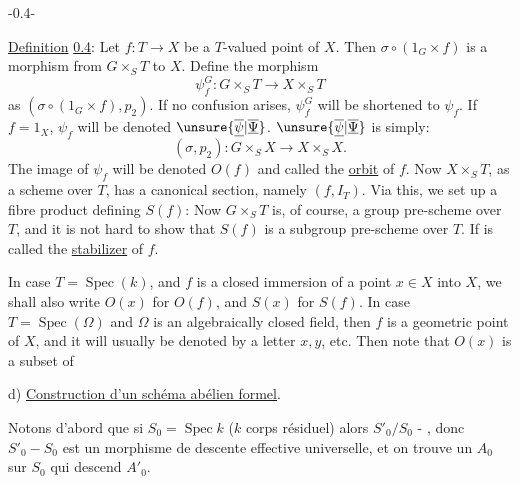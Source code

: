 \begin{center}-0.4-\end{center}
\uline{Definition} \uline{0.4}: Let $f:T\longrightarrow X$ be a $T$-valued point of $X$. Then $\sigma\circ(1_G\times f)$ is a morphism from $G\times_S T$ to $X$. Define the morphism
\[
\psi_f^G:G\times_S T\longrightarrow X\times_S T
\]
as $(\sigma\circ(1_G\times f),p_2)$. If no confusion arises, $\psi_f^G$ will be shortened to $\psi_f$. If $f=1_X$, $\psi_f$ will be denoted $\unsure{\overline{\underline{\psi}}|\overline{\underline{\Psi}}}$. $\unsure{\overline{\underline{\psi}}|\overline{\underline{\Psi}}}$ is simply:
\[
(\sigma,p_2):G\times_S X\longrightarrow X\times_S X.
\]
The image of $\psi_f$ will be denoted $O(f)$ and called the \uline{orbit} of $f$. Now $X\times_S T$, as a scheme over $T$, has a canonical section, namely $(f,I_T)$. Via this, we set up a fibre product defining $S(f)$:
Now $G\times_S T$ is, of course, a group pre-scheme over $T$, and it is not hard to show that $S(f)$ is a subgroup pre-scheme over $T$. If is called the \uline{stabilizer} of $f$.

In case $T=\operatorname{Spec}(k)$, and $f$ is a closed immersion of a point $x\in X$ into $X$, we shall also write $O(x)$ for $O(f)$, and $S(x)$ for $S(f)$. In case $T=\operatorname{Spec}(\Omega)$ and $\Omega$ is an algebraically closed field, then $f$ is a geometric point of $X$, and it will usually be denoted by a letter $x,y$, etc. Then note that $O(x)$ is a subset of

d) \uline{Construction d'un schéma abélien formel}.

Notons d'abord que si $S_0=\operatorname{Spec}k$ ($k$ corps résiduel) alors $S'_0/S_0$ - , donc $S'_0\mathbin{-}S_0$ est un morphisme de descente effective universelle, et on trouve un $A_0$ sur $S_0$ qui descend $A'_0$.

